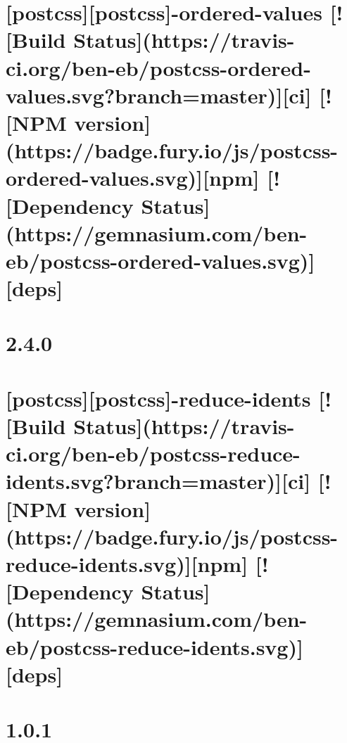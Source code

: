 \documentclass[twoside]{book}
\newcommand{\+}{\discretionary{\mbox{\scriptsize$\hookleftarrow$}}{}{}}
\begin{document}
\chapter{\mbox{[}postcss\mbox{]}\mbox{[}postcss\mbox{]}-\/ordered-\/values \mbox{[}!\mbox{[}Build Status\mbox{]}(https\+://travis-\/ci.org/ben-\/eb/postcss-\/ordered-\/values.svg?branch=master)\mbox{]}\mbox{[}ci\mbox{]} \mbox{[}!\mbox{[}N\+PM version\mbox{]}(https\+://badge.fury.\+io/js/postcss-\/ordered-\/values.svg)\mbox{]}\mbox{[}npm\mbox{]} \mbox{[}!\mbox{[}Dependency Status\mbox{]}(https\+://gemnasium.com/ben-\/eb/postcss-\/ordered-\/values.svg)\mbox{]}\mbox{[}deps\mbox{]}}
\label{md__c_1_workspace_demo_src_main_script_node_modules_postcss-ordered-values__r_e_a_d_m_e}

\chapter{2.4.0}
\label{md__c_1_workspace_demo_src_main_script_node_modules_postcss-reduce-idents__c_h_a_n_g_e_l_o_g}

\chapter{\mbox{[}postcss\mbox{]}\mbox{[}postcss\mbox{]}-\/reduce-\/idents \mbox{[}!\mbox{[}Build Status\mbox{]}(https\+://travis-\/ci.org/ben-\/eb/postcss-\/reduce-\/idents.svg?branch=master)\mbox{]}\mbox{[}ci\mbox{]} \mbox{[}!\mbox{[}N\+PM version\mbox{]}(https\+://badge.fury.\+io/js/postcss-\/reduce-\/idents.svg)\mbox{]}\mbox{[}npm\mbox{]} \mbox{[}!\mbox{[}Dependency Status\mbox{]}(https\+://gemnasium.com/ben-\/eb/postcss-\/reduce-\/idents.svg)\mbox{]}\mbox{[}deps\mbox{]}}
\label{md__c_1_workspace_demo_src_main_script_node_modules_postcss-reduce-idents__r_e_a_d_m_e}

\chapter{1.0.1}
\label{md__c_1_workspace_demo_src_main_script_node_modules_postcss-reduce-initial__c_h_a_n_g_e_l_o_g}

\end{document}
